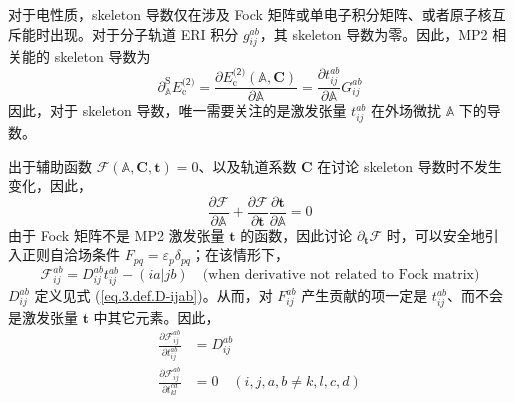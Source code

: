 对于电性质，skeleton 导数仅在涉及 Fock 矩阵或单电子积分矩阵、或者原子核互斥能时出现。对于分子轨道 ERI 积分 $g_{ij}^{ab}$，其 skeleton 导数为零。因此，MP2 相关能的 skeleton 导数为
\begin{equation}
  \label{eq.3.pdSA-Ec-MP2-0}
  \partial_{\mathbb{A}}^\mathrm{S} E_\mathrm{c}^\textsf{(2)} = \frac{\partial E_\mathrm{c}^\textsf{(2)} (\mathbb{A}, \mathbf{C})}{\partial \mathbb{A}} = \frac{\partial t_{ij}^{ab}}{\partial \mathbb{A}} G_{ij}^{ab}
\end{equation}
因此，对于 skeleton 导数，唯一需要关注的是激发张量 $t_{ij}^{ab}$ 在外场微扰 $\mathbb{A}$ 下的导数。

出于辅助函数 $\pmb{\mathscr{F}} (\mathbb{A}, \mathbf{C}, \mathbf{t}) = 0$、以及轨道系数 $\mathbf{C}$ 在讨论 skeleton 导数时不发生变化，因此，
\begin{equation}
  \label{eq.3.auxfunc-pdA}
  \frac{\partial \pmb{\mathscr{F}}}{\partial \mathbb{A}} + \frac{\partial \pmb{\mathscr{F}}}{\partial \mathbf{t}} \frac{\partial \mathbf{t}}{\partial \mathbb{A}} = 0
\end{equation}
由于 Fock 矩阵不是 MP2 激发张量 $\mathbf{t}$ 的函数，因此讨论 $\partial_\mathbf{t} \pmb{\mathscr{F}}$ 时，可以安全地引入正则自洽场条件 $F_{pq} = \varepsilon_p \delta_{pq}$；在该情形下，
\begin{equation*}
  \mathscr{F}_{ij}^{ab} = D_{ij}^{ab} t_{ij}^{ab} - (ia|jb) \quad \text{(when derivative not related to Fock matrix)}
\end{equation*}
$D_{ij}^{ab}$ 定义见式 (\ref{eq.3.def.D-ijab})。从而，对 $F_{ij}^{ab}$ 产生贡献的项一定是 $t_{ij}^{ab}$、而不会是激发张量 $\mathbf{t}$ 中其它元素。因此，
\begin{align}
  \label{eq.3.auxfunc-pdt}
  \frac{\partial \mathscr{F}_{ij}^{ab}}{\partial t_{ij}^{ab}} &= D_{ij}^{ab} \\
  \frac{\partial \mathscr{F}_{ij}^{ab}}{\partial t_{kl}^{cd}} &= 0 \quad (i,j,a,b \neq k,l,c,d)
\end{align}

